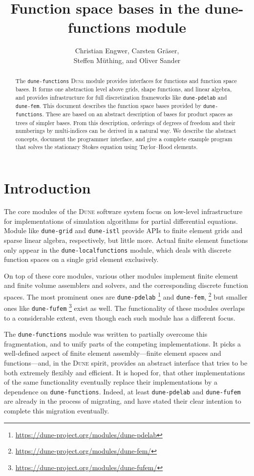 \documentclass[a4paper,10pt,headings=normal,bibliography=totoc]{scrartcl}
\title{Function space bases in the dune-functions module}
\author{Christian Engwer, Carsten Gräser,\\ Steffen Müthing, and Oliver Sander}
\newcommand{\dune}{\textsc{Dune}\xspace}
\newcommand{\dunemodule}[1]{\texttt{#1}}
\begin{document}
\maketitle

\begin{abstract}
 The \dunemodule{dune-functions} \dune module provides interfaces for functions and function space bases.
 It forms one abstraction level above grids, shape functions, and linear algebra, and provides infrastructure
 for full discretization frameworks like \dunemodule{dune-pdelab} and \dunemodule{dune-fem}.
 This document describes the function space bases provided by \dunemodule{dune-functions}.  These are
 based on an abstract description of bases for product spaces as trees of simpler bases.
 From this description, orderings of degrees of freedom and their numberings by multi-indices can be
 derived in a natural way. We describe the abstract concepts, document the programmer interface,
 and give a complete example program that solves the stationary Stokes equation using Taylor--Hood elements.
\end{abstract}

\section*{Introduction}

The core modules of the \dune software system focus on low-level infrastructure for
implementations of simulation algorithms for partial differential equations.  Module like
\dunemodule{dune-grid} and \dunemodule{dune-istl} provide APIs to finite  element grids
and sparse linear algebra, respectively, but little more. Actual finite element functions only
appear in the \dunemodule{dune-localfunctions} module, which deals with discrete function spaces
on a single grid element exclusively.

On top of these core modules, various other modules implement finite element and finite volume assemblers
and solvers, and the corresponding discrete function spaces. The most prominent ones are
\dunemodule{dune-pdelab}%
\footnote{\url{https://dune-project.org/modules/dune-pdelab}}
%
and \dunemodule{dune-fem},%
\footnote{\url{https://dune-project.org/modules/dune-fem/}}
%
but smaller ones like \dunemodule{dune-fufem}%
\footnote{\url{https://dune-project.org/modules/dune-fufem/}}
%
exist as well.  The functionality of these modules overlaps to a considerable extent, even though
each such module has a different focus.

The \dunemodule{dune-functions}  module was written to partially overcome this fragmentation,
and to unify parts of the competing implementations.
It picks a well-defined aspect of finite element assembly---finite element spaces and functions---and,
in the \dune spirit, provides an abstract interface that tries to be both extremely flexibly
and efficient.  It is hoped for, that other implementations of the same functionality
eventually replace their implementations by a dependence on \dunemodule{dune-functions}.
Indeed, at least \dunemodule{dune-pdelab} and \dunemodule{dune-fufem} are already in the process
of migrating, and have stated their clear intention to complete this migration eventually.
\end{document}
